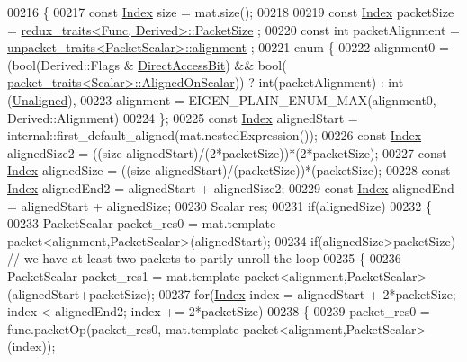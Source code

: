 \begin{DoxyCode}
00216   \{
00217     \textcolor{keyword}{const} \hyperlink{namespace_eigen_a62e77e0933482dafde8fe197d9a2cfde}{Index} size = mat.size();
00218     
00219     \textcolor{keyword}{const} \hyperlink{namespace_eigen_a62e77e0933482dafde8fe197d9a2cfde}{Index} packetSize = \hyperlink{struct_eigen_1_1internal_1_1redux__traits}{redux\_traits<Func, Derived>::PacketSize}
      ;
00220     \textcolor{keyword}{const} \textcolor{keywordtype}{int} packetAlignment = \hyperlink{struct_eigen_1_1internal_1_1unpacket__traits}{unpacket\_traits<PacketScalar>::alignment}
      ;
00221     \textcolor{keyword}{enum} \{
00222       alignment0 = (bool(Derived::Flags & \hyperlink{group__flags_gabf1e9d0516a933445a4c307ad8f14915}{DirectAccessBit}) && bool(
      \hyperlink{struct_eigen_1_1internal_1_1packet__traits}{packet\_traits<Scalar>::AlignedOnScalar})) ? \textcolor{keywordtype}{int}(packetAlignment) : int
      (\hyperlink{group__enums_gga45fe06e29902b7a2773de05ba27b47a1ac935220b4c844108e183ebe30a4d5204}{Unaligned}),
00223       alignment = EIGEN\_PLAIN\_ENUM\_MAX(alignment0, Derived::Alignment)
00224     \};
00225     \textcolor{keyword}{const} \hyperlink{namespace_eigen_a62e77e0933482dafde8fe197d9a2cfde}{Index} alignedStart = internal::first\_default\_aligned(mat.nestedExpression());
00226     \textcolor{keyword}{const} \hyperlink{namespace_eigen_a62e77e0933482dafde8fe197d9a2cfde}{Index} alignedSize2 = ((size-alignedStart)/(2*packetSize))*(2*packetSize);
00227     \textcolor{keyword}{const} \hyperlink{namespace_eigen_a62e77e0933482dafde8fe197d9a2cfde}{Index} alignedSize = ((size-alignedStart)/(packetSize))*(packetSize);
00228     \textcolor{keyword}{const} \hyperlink{namespace_eigen_a62e77e0933482dafde8fe197d9a2cfde}{Index} alignedEnd2 = alignedStart + alignedSize2;
00229     \textcolor{keyword}{const} \hyperlink{namespace_eigen_a62e77e0933482dafde8fe197d9a2cfde}{Index} alignedEnd  = alignedStart + alignedSize;
00230     Scalar res;
00231     \textcolor{keywordflow}{if}(alignedSize)
00232     \{
00233       PacketScalar packet\_res0 = mat.template packet<alignment,PacketScalar>(alignedStart);
00234       \textcolor{keywordflow}{if}(alignedSize>packetSize) \textcolor{comment}{// we have at least two packets to partly unroll the loop}
00235       \{
00236         PacketScalar packet\_res1 = mat.template packet<alignment,PacketScalar>(alignedStart+packetSize);
00237         \textcolor{keywordflow}{for}(\hyperlink{namespace_eigen_a62e77e0933482dafde8fe197d9a2cfde}{Index} index = alignedStart + 2*packetSize; index < alignedEnd2; index += 2*packetSize)
00238         \{
00239           packet\_res0 = func.packetOp(packet\_res0, mat.template packet<alignment,PacketScalar>(index));

\end{DoxyCode}
